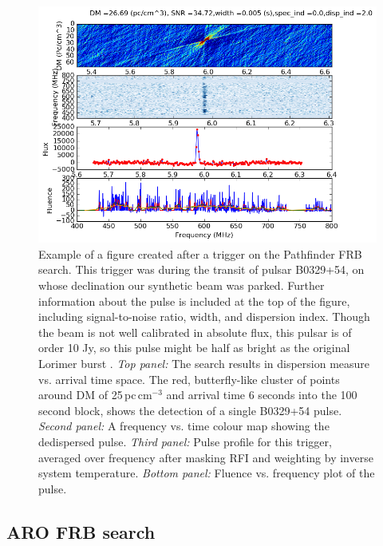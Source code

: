 \begin{figure}[!h]
\begin{center}
\includegraphics[trim={0in, 0in, 0in, 0in}, scale=0.75]{./figures/beamforming/b0329_trigger.png}
\caption[abc]{Example of a figure created after a trigger 
on the Pathfinder FRB search. This trigger was during the transit of 
pulsar B0329+54, on whose declination our synthetic beam was 
parked. Further information about the pulse is 
included at the top of the figure, including 
signal-to-noise ratio, width, and dispersion index. Though the 
beam is not well calibrated in absolute flux, this pulsar 
is of order 10 Jy, so this pulse might be half as bright 
as the original Lorimer burst \citep{lorimer-2007}. 
\textit{Top panel:} The search results 
in dispersion measure vs. arrival time space. The red, butterfly-like 
cluster of points around DM of 25\,pc\,cm$^{-3}$ and arrival time 
6 seconds into the 100 second block, 
shows the detection of a single B0329+54 pulse. 
\textit{Second panel:} A frequency 
vs. time colour map showing the dedispersed pulse. \textit{Third panel:} 
Pulse profile for this trigger, averaged over frequency after 
masking RFI and weighting by inverse system temperature. \textit{Bottom panel:}
Fluence vs. frequency plot of the pulse.}  
\label{fig-b0329_trigger}
\vspace{0.4cm}   
\end{center}
\end{figure}

\subsection{ARO FRB search}

